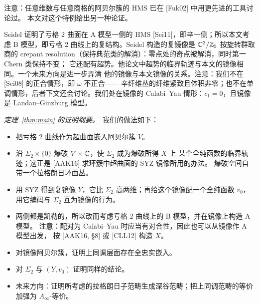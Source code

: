 \begin{remark}\label{rem:fuk02}
注意：任意维数与任意商格的阿贝尔簇的 HMS 已在 [Fuk02] 中用更先进的工具讨论过。
本文对这个特例给出另一种论证。
\end{remark}

\begin{remark}\label{rem:seidel}
Seidel 证明了亏格 $2$ 曲面在 A 模型一侧的 HMS [Sei11]，即辛一侧；所以本文考虑
B 模型，即亏格 $2$ 曲线上的复结构。Seidel 构造的复镜像是 $\mathbb{C}^3/\mathbb{Z}_5$ 按旋转群取商的
crepant resolution（保持典范类的解消）：零点处的奇点被解消，同时第一 Chern 类保持不变；
它还配有超势。他论文中超势的临界轨迹与本文的镜像相同。一个未来方向是进一步弄清
他的镜像与本文镜像的关系。注意：我们不在 [Sei08] 的正合情形，即 $\omega$ 不正合——
辛纤维丛的纤维紧致且体积非零；也不在单调情形，后者下文还会讨论。我们处在镜像的
Calabi--Yau 情形：$c_1=0$，且镜像是 Landau--Ginzburg 模型。
\end{remark}



\noindent\textit{定理~\ref{thm:main} 的证明纲要。}\ 我们的做法如下：
\begin{itemize}[leftmargin=2.2em,itemsep=0.25em]
\item 把亏格 $2$ 曲线作为超曲面嵌入阿贝尔簇 $V$。
\item 沿 $\Sigma_2\times\{0\}$ 爆破 $V\times\mathbb{C}$，使 $\Sigma_2$ 成为爆破所得 $X$ 上
  某个全纯函数的临界轨迹；这正是 [AAK16] 求环簇中超曲面的 SYZ 镜像所用的办法。
  爆破空间自带一个拉格朗日环面丛。
\item 用 SYZ 得到复镜像 $Y$，它比 $\Sigma_2$ 高两维；再给这个镜像配一个全纯函数
  $v_0$，用它编码与 $\Sigma_2$ 互为镜像的行为。
\item 两侧都是凯勒的，所以改而考虑亏格 $2$ 曲线上的 B 模型，并在镜像上构造 A 模型。
  注意：配对为 Calabi--Yau 时应当有对合性，因此也可以从镜像作 A 模型出发，
  按 [AAK16, §8] 或 [CLL12] 构造 $X$。
\item 对镜像阿贝尔簇，证明上同调层面存在全忠实嵌入。
\item 对 $\Sigma_2$ 与 $(Y,v_0)$ 证明同样的结论。
\item 未来方向：证明所考虑的拉格朗日子范畴生成深谷范畴；把上同调范畴的等价
  加强为 $A_\infty$-等价。
\end{itemize}


